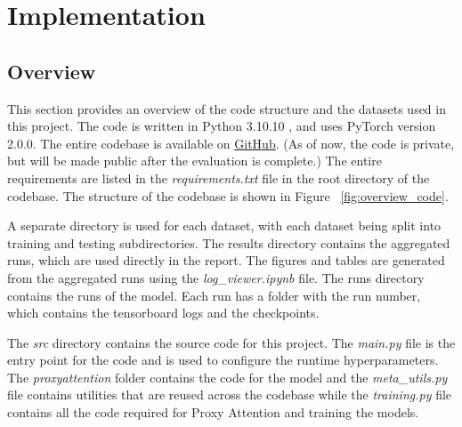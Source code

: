 \chapter{Implementation} \label{ch:implementation}
\section{Overview}
This section provides an overview of the code structure and the datasets used in this project. The code is written in Python 3.10.10 , and uses PyTorch version 2.0.0. The entire codebase is available on \href{https://github.com/SubhadityaMukherjee/proxy_attention}{GitHub}. (As of now, the code is private, but will be made public after the evaluation is complete.) The entire requirements are listed in the \textit{requirements.txt} file in the root directory of the codebase. The structure of the codebase is shown in Figure ~\ref{fig:overview_code}.

A separate directory is used for each dataset, with each dataset being split into training and testing subdirectories. The results directory contains the aggregated runs, which are used directly in the report. The figures and tables are generated from the aggregated runs using the \textit{log\_viewer.ipynb} file. The runs directory contains the runs of the model. Each run has a folder with the run number, which contains the tensorboard logs and the checkpoints. 

The \textit{src} directory contains the source code for this project. The \textit{main.py} file is the entry point for the code and is used to configure the runtime hyperparameters. The \textit{proxyattention} folder contains the code for the model and the \textit{meta\_utils.py} file contains utilities that are reused across the codebase while the \textit{training.py} file contains all the code required for Proxy Attention and training the models.


